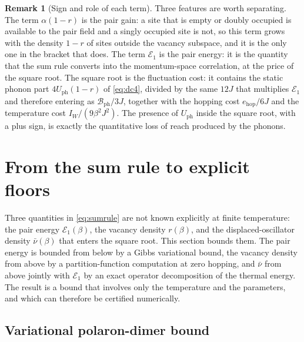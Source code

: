 \documentclass[11pt]{article}
\numberwithin{equation}{section}
\newcommand{\ph}{\mathrm{ph}}
\newcommand{\hop}{\mathrm{hop}}
\theoremstyle{definition}
\newtheorem{remark}[theorem]{Remark}
\begin{document}
\begin{remark}[Sign and role of each term]\label{rem:sumrule-parts}
Three features are worth separating. The term $\alpha(1-r)$ is the pair gain: a site that
is empty or doubly occupied is available to the pair field and a singly occupied site is
not, so this term grows with the density $1-r$ of sites outside the vacancy subspace, and
it is the only one in the bracket that does. The term $\mathcal{E}_{1}$ is the pair
energy: it is the quantity that the sum rule converts into the momentum-space
correlation, at the price of the square root. The square root is the fluctuation cost: it
contains the static phonon part $4U_{\mathrm{ph}}(1-r)$ of \eqref{eq:dc4}, divided by the
same $12J$ that multiplies $\mathcal{E}_{1}$ and therefore entering as
$\mathcal{B}_{\ph}/3J$, together with the hopping cost $e_{\hop}/6J$ and the temperature
cost $I_{W}/(9\beta^{2}J^{2})$. The presence of $U_{\mathrm{ph}}$ inside the square root,
with a plus sign, is exactly the quantitative loss of reach produced by the phonons.
\end{remark}

\section{From the sum rule to explicit floors}\label{sec:finiteT}

Three quantities in \eqref{eq:sumrule} are not known explicitly at finite temperature: the pair energy
$\mathcal{E}_{1}(\beta)$, the vacancy density $r(\beta)$, and the displaced-oscillator
density $\bar\nu(\beta)$ that enters the square root. This section bounds them. The pair
energy is bounded from below by a Gibbs variational bound, the vacancy density from above
by a partition-function computation at zero hopping, and $\bar\nu$ from above jointly with
$\mathcal{E}_{1}$ by an exact operator decomposition of the thermal energy. The result is
a bound that involves only the temperature and the parameters, and which can therefore be
certified numerically.

\subsection{Variational polaron-dimer bound}
\end{document}
